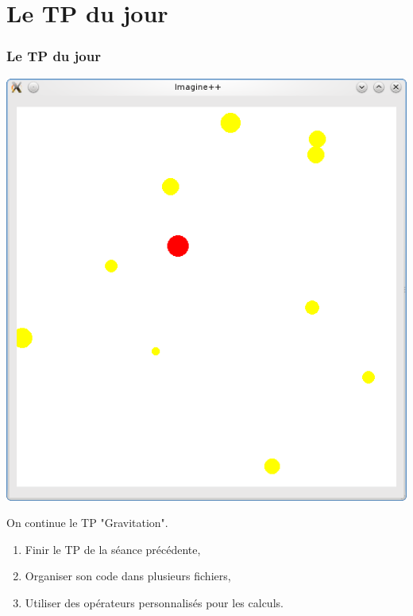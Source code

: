 \section{Le TP du jour}

\begin{frame}
\frametitle{Le TP du jour}
\begin{minipage}{0.45\textwidth}
\includegraphics[width=\textwidth]{images/gravit.png}
\end{minipage}
\hfill
\begin{minipage}{0.48\textwidth}
On continue le TP "Gravitation".

\begin{enumerate}
\item Finir le TP de la séance précédente,
\item Organiser son code dans plusieurs fichiers,
\item Utiliser des opérateurs personnalisés pour les calculs.
\end{enumerate}
\end{minipage}
\end{frame}




